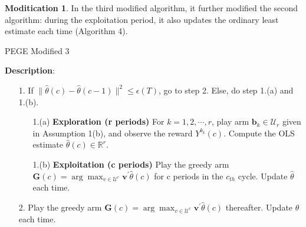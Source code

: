 \documentclass{article}
\theoremstyle{plain}
\theoremstyle{definition}
\newtheorem{modification}{Moditication}
\begin{document}
\begin{modification}
In the third modified algorithm, it further modified the second algorithm: during the exploitation period, it also updates the ordinary least estimate each time (Algorithm 4).

\begin{algorithm}\label{alg:PEGE3}
\caption{PEGE Modified 3}
\textbf{Description}: 
\begin{itemize}
\item [1.  ] If $\|\hat{\theta}(c)-\hat{\theta}(c-1)\|^{2}\leq \epsilon(T)$, go to step 2. Else, do step 1.(a) and 1.(b).
\begin{enumerate}
\item [1.(a) ] \textbf{Exploration (r periods)} For $k=1,2,\cdots,r$, play arm $\textbf{b}_{k}\in \mathcal{U}_{r}$ given in Assumption 1(b), and observe the reward $Y^{b_{k}}(c)$. Compute the OLS estimate $\hat{\theta}(c)\in \mathbb{R}^{r}$.
\item [1.(b) ] \textbf{Exploitation (c periods)} Play the greedy arm $\textbf{G}(c)=\arg \max_{v\in \mathcal{U}^{r}}\textbf{v}^{'}\hat{\theta}(c)$ for c periods in the $c_{th}$ cycle. Update $\hat{\theta}$ each time.
\end{enumerate}
\item[2.  ] Play the greedy arm $\textbf{G}(c)=\arg \max_{v\in \mathcal{U}^{r}}\textbf{v}^{'}\hat{\theta}(c)$ thereafter. Update $\hat{\theta}$ each time.
\end{itemize}
\end{algorithm}

\end{modification}
\end{document}
